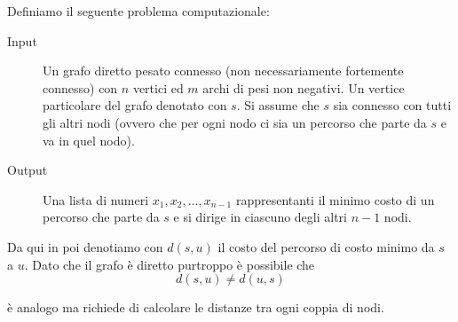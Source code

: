 \documentclass[11pt]{scrartcl}
\begin{document}
	\begin{example}
		Definiamo il seguente problema computazionale:
		\begin{description}
			\item[Input] Un grafo diretto pesato connesso (non necessariamente fortemente connesso) con $n$ vertici ed $m$ archi di pesi non negativi. Un vertice particolare del grafo denotato con $s$. Si assume che $s$ sia connesso con tutti gli altri nodi (ovvero che per ogni nodo ci sia un percorso che parte da $s$ e va in quel nodo).
			\item[Output] Una lista di numeri $x_1,x_2,\dots,x_{n-1}$ rappresentanti il minimo costo di un percorso che parte da $s$  e si dirige in ciascuno degli altri $n-1$ nodi.
		\end{description}
		Da qui in poi denotiamo con $d(s,u)$ il costo del percorso di costo minimo da $s$ a $u$. Dato che il grafo è diretto purtroppo è possibile che
		$$d(s,u)\ne d(u,s)$$
	\end{example}
	\begin{example}
		è analogo ma richiede di calcolare le distanze tra ogni coppia di nodi.
	\end{example}
	
\end{document}
